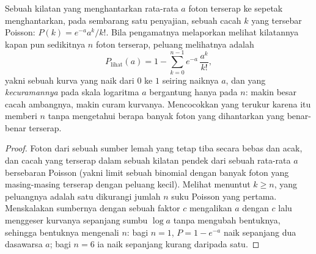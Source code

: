 \begin{theorem}\label{thm:b3:sensory-systems:hecht}
%
Sebuah kilatan yang menghantarkan rata-rata $a$ foton terserap ke sepetak
 menghantarkan, pada sembarang satu penyajian, sebuah cacah $k$ yang
tersebar Poisson: $P(k) = e^{-a}a^{k}/k!$. Bila pengamatnya melaporkan melihat
kilatannya kapan pun sedikitnya $n$ foton terserap, peluang
melihatnya adalah
\[
P_{\text{lihat}}(a) = 1 - \sum_{k=0}^{n-1} e^{-a}\,\frac{a^{k}}{k!} ,
\]
yakni sebuah kurva yang naik dari $0$ ke $1$ seiring naiknya $a$, dan yang
\emph{kecuramannya} pada skala logaritma $a$ bergantung hanya pada $n$:
makin besar cacah ambangnya, makin curam kurvanya. Mencocokkan
 yang terukur karena itu memberi $n$ tanpa
mengetahui berapa banyak foton yang dihantarkan yang benar-benar terserap.
\end{theorem}
\begin{proof}
Foton dari sebuah sumber lemah yang tetap tiba secara bebas dan acak, dan
cacah yang terserap dalam sebuah kilatan pendek dari sebuah rata-rata $a$ bersebaran Poisson
(yakni limit sebuah binomial dengan banyak foton yang masing-masing terserap dengan peluang
kecil). Melihat menuntut $k \ge n$, yang peluangnya adalah satu
dikurangi jumlah $n$ suku Poisson yang pertama. Menskalakan sumbernya dengan sebuah
faktor $c$ mengalikan $a$ dengan $c$ lalu menggeser kurvanya sepanjang sumbu $\log a$
tanpa mengubah bentuknya, sehingga bentuknya mengenali $n$: bagi $n =
1$, $P = 1 - e^{-a}$ naik sepanjang dua dasawarsa $a$; bagi $n = 6$ ia
naik sepanjang kurang daripada satu.
\end{proof}

